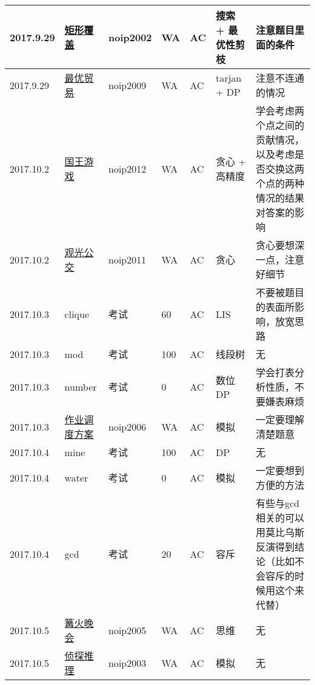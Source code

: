 \documentclass[a4paper]{article}
\begin{document}
\begin{longtable}{|p{1.5cm}|p{2.5cm}|p{1.6cm}|p{1.6cm}|p{1cm}|p{3cm}|p{4cm}|}
		\hline
		2017.9.29 & \href {https://www.luogu.org/problem/show?pid=1034#sub}{矩形覆盖}
		 & noip2002 & WA & AC & 搜索 + 最优性剪枝 & 注意题目里面的条件\\
		
		\hline
		2017.9.29 & \href {https://www.luogu.org/problem/show?pid=1073#sub}{最优贸易}
		 & noip2009 & WA & AC & tarjan + DP & 注意不连通的情况\\
		
		\hline
		2017.10.2 & \href {https://www.luogu.org/problem/show?pid=1080#sub}{国王游戏}
		 & noip2012 & WA & AC & 贪心 + 高精度 & 学会考虑两个点之间的贡献情况，以及考虑是否交换这两个点的两种情况的结果对答案的影响\\
		
		\hline
		2017.10.2 & \href {https://www.luogu.org/problem/show?pid=1315#sub}{观光公交}
		 & noip2011 & WA & AC & 贪心 & 贪心要想深一点，注意好细节\\
		
		\hline
		2017.10.3 & clique
		 & 考试 & 60 & AC & LIS & 不要被题目的表面所影响，放宽思路\\
		
		\hline
		2017.10.3 & mod
		 & 考试 & 100 & AC & 线段树 & 无\\
		
		\hline
		2017.10.3 & number
		 & 考试 & 0 & AC & 数位DP & 学会打表分析性质，不要嫌表麻烦\\
		
		\hline
		2017.10.3 & \href {https://www.luogu.org/problem/show?pid=1065#sub}{作业调度方案}
		 & noip2006 & WA & AC & 模拟 & 一定要理解清楚题意\\
		
		\hline
		2017.10.4 & mine
		 & 考试 & 100 & AC & DP & 无\\
		
		\hline
		2017.10.4 & water
		 & 考试 & 0 & AC & 模拟 & 一定要想到方便的方法\\
		
		\hline
		2017.10.4 & gcd
		 & 考试 & 20 & AC & 容斥 & 有些与gcd相关的可以用莫比乌斯反演得到结论（比如不会容斥的时候用这个来代替）\\
		
		\hline
		2017.10.5 & \href {https://www.luogu.org/problem/show?pid=1053#sub}{篝火晚会}
		 & noip2005 & WA & AC & 思维 & 无\\
		
		\hline
		2017.10.5 & \href {https://www.luogu.org/problem/show?pid=1039#sub}{侦探推理}
		 & noip2003 & WA & AC & 模拟 & 无\\
		

\end{longtable}
\end{document}
